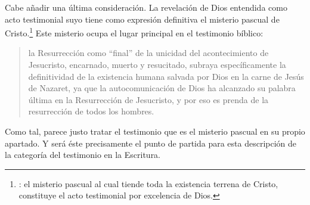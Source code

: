 Cabe añadir una última consideración. La revelación de Dios entendida como acto
testimonial suyo tiene como expresión definitiva el misterio pascual de
Cristo.\footnote{\cite[128]{prades2015testimonio}: el misterio pascual al cual
  tiende toda la existencia terrena de Cristo, constituye el acto testimonial
  por excelencia de Dios.} Este misterio ocupa el lugar principal en el
testimonio bíblico:
\blockquote[{\cite[404]{ninot2009tf}}]{la Resurrección como \enquote{final} de
  la unicidad del acontecimiento de Jesucristo, encarnado, muerto y resucitado,
  subraya específicamente la definitividad de la existencia humana salvada por
  Dios en la carne de Jesús de Nazaret, ya que la autocomunicación de Dios ha
  alcanzado su palabra última en la Resurrección de Jesucristo, y por eso es
  prenda de la resurrección de todos los hombres.}
Como tal, parece justo tratar el testimonio que es el misterio pascual en su
propio apartado. Y será éste precisamente el punto de partida para esta
descripción de la categoría del testimonio en la Escritura.
